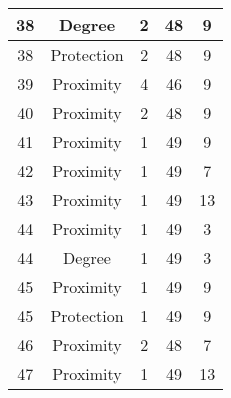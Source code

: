 \documentclass[results.tex]{subfiles}
\begin{document}
\begin{center}
\begin{tabular}{| c || c | c | c | c |}
            \hline
            38                      & Degree                       & 2                      & 48                      & 9                    \\
            \hline
            38                      & Protection                   & 2                      & 48                      & 9                    \\
            \hline
            39                      & Proximity                    & 4                      & 46                      & 9                    \\
            \hline
            40                      & Proximity                    & 2                      & 48                      & 9                    \\
            \hline
            41                      & Proximity                    & 1                      & 49                      & 9                    \\
            \hline
            42                      & Proximity                    & 1                      & 49                      & 7                    \\
            \hline
            43                      & Proximity                    & 1                      & 49                      & 13                   \\
            \hline
            44                      & Proximity                    & 1                      & 49                      & 3                    \\
            \hline
            44                      & Degree                       & 1                      & 49                      & 3                    \\
            \hline
            45                      & Proximity                    & 1                      & 49                      & 9                    \\
            \hline
            45                      & Protection                   & 1                      & 49                      & 9                    \\
            \hline
            46                      & Proximity                    & 2                      & 48                      & 7                    \\
            \hline
            47                      & Proximity                    & 1                      & 49                      & 13                   \\

\end{tabular}
\end{center}
\end{document}
